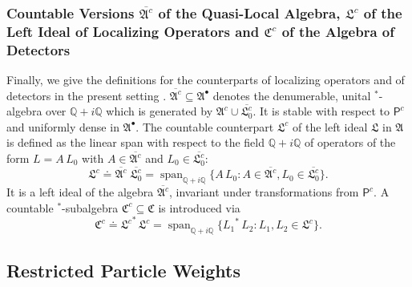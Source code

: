\documentclass[a4paper,a4paper]{article}
\numberwithin{equation}{section}
\newcommand{\Qbb}{\mathbb{Q}}
\newcommand{\Afrak}{\mathfrak{A}}
\newcommand{\Cfrak}{\mathfrak{C}}
\newcommand{\Lfrak}{\mathfrak{L}}
\newcommand{\Acountbar}{\overline{\mathfrak{A}^c}}
\newcommand{\Pcount}{\mathsf{P}^c}
\newcommand{\Acount}{\mathfrak{A}^c}
\newcommand{\detectcount}{\mathfrak{C}^c}
\newcommand{\idealcount}{\mathfrak{L}^c}
\newcommand{\vaccountbar}{\overline{\mathfrak{L}_0^c}}
\newcommand{\Abullet}{\mathfrak{A}^\bullet}
\theoremstyle{definition}
\theoremstyle{plain}
\theoremstyle{remark}
\theoremstyle{assumption}
\DeclareMathOperator{\linhull}{span}
\newcommand{\bset}[1]{\bigl\{ #1 \bigr\}}
\begin{document}
  \subsubsection{Countable Versions $\Acountbar$ of the Quasi-Local
    Algebra, $\idealcount$ of the Left Ideal of Localizing Operators
    and $\detectcount$ of the Algebra of Detectors}
  
  Finally, we give the definitions for the counterparts of localizing
  operators and of detectors in the present setting
  \cite[Definitions~2.4 and 2.5]{porrmann:2002a}. $\Acountbar
  \subseteq \Abullet$ denotes the denumerable, unital $^*$-algebra
  over $\Qbb + i \Qbb$ which is generated by $\Acount \cup
  \vaccountbar$. It is stable with respect to $\Pcount$ and uniformly
  dense in $\Abullet$. The countable counterpart $\idealcount$ of the
  left ideal $\Lfrak$ in $\Afrak$ is defined as the linear span with
  respect to the field $\Qbb + i \Qbb$ of operators of the form $L = A
  \, L_0$ with $A \in \Acountbar$ and $L_0 \in \vaccountbar$:
  \begin{equation}
    \label{eq:def-idealcount}
    \idealcount \doteq \Acountbar \; \vaccountbar = \linhull_{\Qbb + i
    \Qbb} \bset{A \, L_0 : A \in \Acountbar , L_0 \in \vaccountbar}
    \text{.}
  \end{equation}
  It is a left ideal of the algebra $\Acountbar$, invariant under
  transformations from $\Pcount$. A countable $^*$-subalgebra
  $\detectcount \subseteq \Cfrak$ is introduced via
  \begin{equation}
    \label{eq:def-detectcount}
    \detectcount \doteq {\idealcount}^* \, \idealcount =
    \linhull_{\Qbb  + i \Qbb} \bset{{L_1}^* \, L_2 : L_1 , L_2 \in
    \idealcount} \text{.}
  \end{equation}

\subsection{Restricted Particle Weights}
  \label{subsec:restricted-particle-weights}
  
\end{document}
